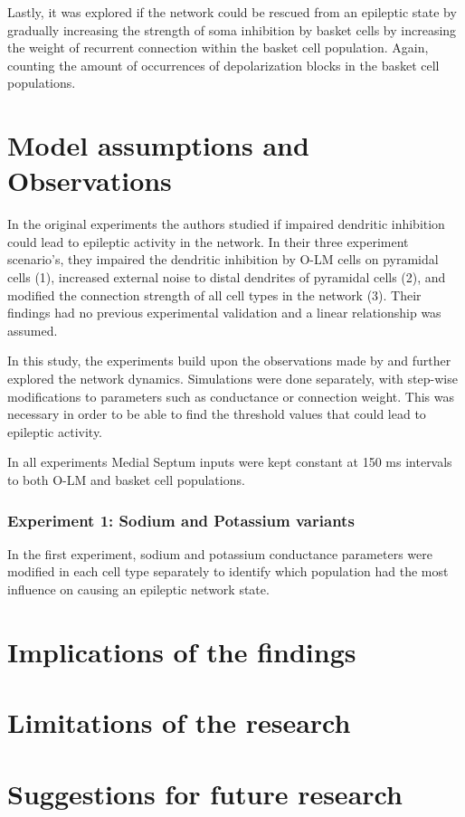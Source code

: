 Lastly, it was explored if the network could be rescued from an epileptic state by gradually increasing the strength of soma inhibition by basket cells 
by increasing the weight of recurrent connection within the basket cell population. Again, counting the amount of occurrences of depolarization blocks 
in the basket cell populations.

\section{Model assumptions and Observations}
In the original experiments \textcite{sanjayImpairedDendriticInhibition2015} the authors studied if impaired dendritic 
inhibition could lead to epileptic activity in the network.
In their three experiment scenario's, they impaired the dendritic inhibition by O-LM cells on pyramidal cells (1), increased external noise to distal dendrites of pyramidal cells (2),
and modified the connection strength of all cell types in the network (3). Their findings had no previous experimental validation and a linear relationship was assumed.

In this study, the experiments build upon the observations made by \textcite{sanjayImpairedDendriticInhibition2015} and further explored the network dynamics.
Simulations were done separately, with step-wise modifications to parameters such as conductance or connection weight.
This was necessary in order to be able to find the threshold values that could lead to epileptic activity.

In all experiments Medial Septum inputs were kept constant at 150 ms intervals to both O-LM and basket cell populations.

\subsubsection{Experiment 1: Sodium and Potassium variants}
In the first experiment, sodium and potassium conductance parameters were modified in each cell type separately 
to identify which population had the most influence on causing an epileptic network state.




\section{Implications of the findings}

\section{Limitations of the research}

\section{Suggestions for future research}